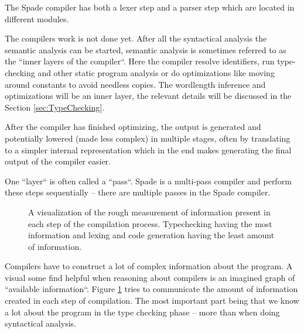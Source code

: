 The Spade compiler has both a lexer step and a parser step which are located in different modules.

The compilers work is not done yet. After all the syntactical analysis the semantic analysis can be started, semantic analysis is sometimes referred to as the ``inner layers of the compiler``. Here the compiler resolve identifiers, run type-checking and other static program analysis or do optimizations like moving around constants to avoid needless copies. The wordlength inference and optimizations will be an inner layer, the relevant details will be discussed in the Section \ref{sec:TypeChecking}. 

After the compiler has finished optimizing, the output is generated and potentially lowered (made less complex) in multiple stages, often by translating to a simpler internal representation which in the end makes generating the final output of the compiler easier.

One ``layer`` is often called a ``pass``. Spade is a multi-pass compiler and perform these steps sequentially -- there are multiple passes in the Spade compiler.
\cite{src:DragonBook}\cite{src:CraftingInterp}\cite{src:KKLectures}

\begin{figure}
\begin{center}
  \caption{A visualization of the rough measurement of information present in each step of the compilation process. Typechecking having the most information and lexing and code generation having the least amount of information.}
  \label{fig:InformationCompilation}
\end{center}
\end{figure}

Compilers have to construct a lot of complex information about the program. A visual some find helpful when reasoning about compilers is an imagined graph of ``available information``. Figure \ref{fig:InformationCompilation} tries to communicate the amount of information created in each step of compilation. The most important part being that we know a lot about the program in the type checking phase -- more than when doing syntactical analysis.

